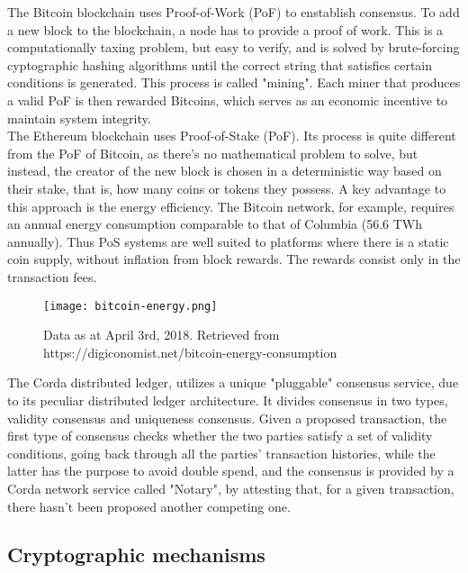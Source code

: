 The Bitcoin blockchain uses Proof-of-Work (PoF) to enstablish consensus. To add a new block to the blockchain, a node has to provide a proof of work. This is a computationally taxing problem, but easy to verify, and is solved by brute-forcing cyptographic hashing algorithms until the correct string that satisfies certain conditions is generated. This process is called "mining". Each miner that produces a valid PoF is then rewarded Bitcoins, which serves as an economic incentive to maintain system integrity. \\

The Ethereum blockchain uses Proof-of-Stake (PoF). Its process is quite different from the PoF of Bitcoin, as there's no mathematical problem to solve, but instead, the creator of the new block is chosen in a deterministic way based on their stake, that is, how many coins or tokens they possess. 
A key advantage to this approach is the energy efficiency. The Bitcoin network, for example, requires an annual energy consumption comparable to that of Columbia (56.6 TWh annually). 
Thus PoS systems are well suited to platforms where there is a static coin supply, without inflation from block rewards. The rewards consist only in the transaction fees. \\

\begin{figure}[h]
    \centering
    \texttt{[image: bitcoin-energy.png]}
    \caption{
        Data as at April 3rd, 2018. Retrieved from https://digiconomist.net/bitcoin-energy-consumption}
\end{figure}

The Corda distributed ledger, utilizes a unique "pluggable" consensus service, due to its peculiar distributed ledger architecture. It divides consensus in two types, validity consensus and uniqueness consensus. Given a proposed transaction, the first type of consensus checks whether the two parties satisfy a set of validity conditions, going back through all the parties' transaction histories, while the latter has the purpose to avoid double spend, and the consensus is provided by a Corda network service called "Notary", by attesting that, for a given transaction, there hasn't been proposed another competing one.\\

\subsection{Cryptographic mechanisms}

